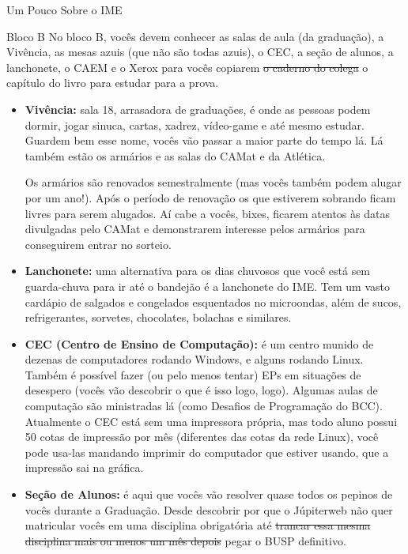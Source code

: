 \begin{secao}{Um Pouco Sobre o IME}
\begin{subsecao}{Bloco B}
No bloco B, vocês devem conhecer as salas de aula (da graduação), a Vivência, as
mesas azuis (que não são todas azuis), o CEC, a seção de alunos, a lanchonete, 
o CAEM e o Xerox para vocês copiarem \sout{o caderno do colega} o capítulo do 
livro para estudar para a prova.

\begin{itemize}
\item {\bf Vivência:} sala 18, arrasadora de graduações, é onde as pessoas podem
dormir, jogar sinuca, cartas, xadrez, vídeo-game e até
mesmo estudar. Guardem bem esse nome, vocês vão passar a maior parte do tempo lá.
Lá também estão os armários e as salas do CAMat e da Atlética.

Os armários são renovados semestralmente (mas vocês também podem alugar por um ano!). 
Após o período de renovação os que estiverem sobrando ficam livres para serem alugados. 
Aí cabe a vocês, bixes, ficarem atentos às datas divulgadas pelo CAMat e demonstrarem 
interesse pelos armários para conseguirem entrar no sorteio.

\item {\bf Lanchonete:} uma alternativa para os dias chuvosos que você está sem
  guarda-chuva para ir até o bandejão é a lanchonete do IME. Tem um vasto
  cardápio de salgados e congelados esquentados no microondas, além de sucos,
  refrigerantes, sorvetes, chocolates, bolachas e similares.

\item {\bf CEC (Centro de Ensino de Computação):} é um centro munido de dezenas
de computadores rodando Windows, e alguns rodando Linux. Também é possível fazer
(ou pelo menos tentar) EPs em situações de desespero (vocês vão descobrir o que é
isso logo, logo). Algumas aulas de computação são ministradas lá (como Desafios
de Programação do BCC). Atualmente o CEC está sem uma impressora própria, mas todo aluno possui 50 cotas de impressão por mês (diferentes das cotas da rede Linux), você pode usa-las mandando imprimir do computador que estiver usando, que a impressão sai na gráfica.

\item {\bf Seção de Alunos:} é aqui que vocês vão resolver quase todos os
pepinos de vocês durante a Graduação. Desde descobrir por que o Júpiterweb não
quer matricular vocês em uma disciplina obrigatória até \sout{trancar essa mesma
disciplina mais ou menos um mês depois} pegar o BUSP definitivo. %


\end{itemize}
\end{subsecao}
\end{secao}
